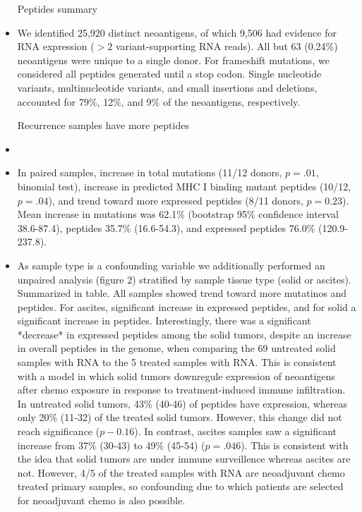 \begin{itemize}
Peptides summary
\item We identified 25,920 distinct neoantigens, of which 9,506 had evidence for RNA expression ($>2$ variant-supporting RNA reads). All but 63 (0.24\%) neoantigens were unique to a single donor. For frameshift mutations, we considered all peptides generated until a stop codon. Single nucleotide variants, multinucleotide variants, and small insertions and deletions, accounted for 79\%, 12\%, and 9\% of the neoantigens, respectively.

Recurrence samples have more peptides
\item 
\item In paired samples, increase in total mutations (11/12 donors, $p=.01$, binomial test), increase in predicted MHC I binding mutant peptides (10/12, $p=.04$), and trend toward more expressed peptides (8/11 donors, $p=0.23$).  Mean increase in mutations was 62.1\% (bootstrap 95\% confidence interval 38.6-87.4), peptides 35.7\% (16.6-54.3), and expressed peptides 76.0\% (120.9-237.8).
\item As sample type is a confounding variable we additionally performed an unpaired analysis (figure 2) stratified by sample tissue type (solid or ascites). Summarized in table. All samples showed trend toward more mutatinos and peptides. For ascites, significant increase in expressed peptides, and for solid a significant increase in peptides. Interestingly, there was a significant *decrease* in expressed peptides among the solid tumors, despite an increase in overall peptides in the genome, when comparing the 69 untreated solid samples with RNA to the 5 treated samples with RNA.  This is consistent with a model in which solid tumors downregule expression of neoantigens after chemo exposure in response to treatment-induced immune infiltration. In untreated solid tumors, 43\% (40-46) of peptides have expression, whereas only 20\% (11-32) of the treated solid tumors. However, this change did not reach significance ($p-0.16$). In contrast, ascites samples saw a significant increase from 37\% (30-43) to 49\% (45-54) ($p=.046$). This is consistent with the idea that solid tumors are under immune surveillence whereas ascites are not. However, 4/5 of the treated samples with RNA are neoadjuvant chemo treated primary samples, so confounding due to which patients are selected for neoadjuvant chemo is also possible.



\end{itemize}
